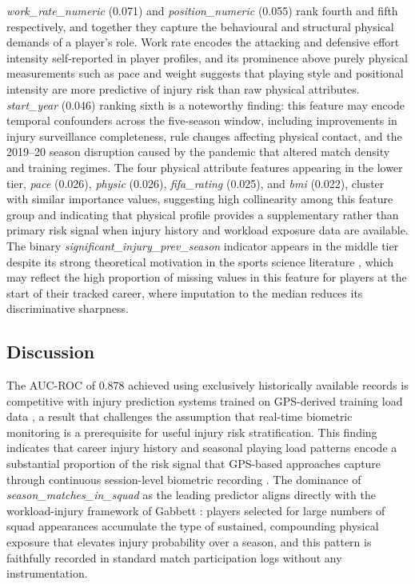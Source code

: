\documentclass[conference]{IEEEtran}
\begin{document}
\textit{work\_rate\_numeric} (0.071) and \textit{position\_numeric} (0.055) rank fourth and fifth respectively, and together they capture the behavioural and structural physical demands of a player's role. Work rate encodes the attacking and defensive effort intensity self-reported in player profiles, and its prominence above purely physical measurements such as pace and weight suggests that playing style and positional intensity are more predictive of injury risk than raw physical attributes. \textit{start\_year} (0.046) ranking sixth is a noteworthy finding: this feature may encode temporal confounders across the five-season window, including improvements in injury surveillance completeness, rule changes affecting physical contact, and the 2019--20 season disruption caused by the pandemic that altered match density and training regimes. The four physical attribute features appearing in the lower tier, \textit{pace} (0.026), \textit{physic} (0.026), \textit{fifa\_rating} (0.025), and \textit{bmi} (0.022), cluster with similar importance values, suggesting high collinearity among this feature group and indicating that physical profile provides a supplementary rather than primary risk signal when injury history and workload exposure data are available. The binary \textit{significant\_injury\_prev\_season} indicator appears in the middle tier despite its strong theoretical motivation in the sports science literature \cite{hagglund2006previous}, which may reflect the high proportion of missing values in this feature for players at the start of their tracked career, where imputation to the median reduces its discriminative sharpness.

\subsection{Discussion}

The AUC-ROC of 0.878 achieved using exclusively historically available records is competitive with injury prediction systems trained on GPS-derived training load data \cite{rossi2018effective, carey2018predictive}, a result that challenges the assumption that real-time biometric monitoring is a prerequisite for useful injury risk stratification. This finding indicates that career injury history and seasonal playing load patterns encode a substantial proportion of the risk signal that GPS-based approaches capture through continuous session-level biometric recording \cite{akenhead2016training}. The dominance of \textit{season\_matches\_in\_squad} as the leading predictor aligns directly with the workload-injury framework of Gabbett \cite{gabbett2016training}: players selected for large numbers of squad appearances accumulate the type of sustained, compounding physical exposure that elevates injury probability over a season, and this pattern is faithfully recorded in standard match participation logs without any instrumentation.
\end{document}
